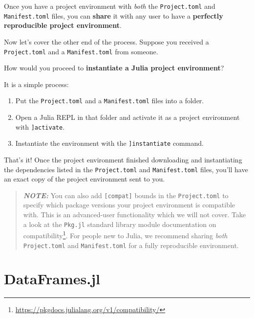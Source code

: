 \documentclass[
  notoc %
]{tufte-book}
\DeclareRobustCommand{\href}[2]{#2\footnote{\url{#1}}}
\providecommand{\tightlist}{%
  \setlength{\itemsep}{0pt}\setlength{\parskip}{0pt}
}
\newcommand{\passthrough}[1]{#1}
\begin{document}
Once you have a project environment with \emph{both} the
\passthrough{\lstinline!Project.toml!} and
\passthrough{\lstinline!Manifest.toml!} files, you can \textbf{share} it
with any user to have a \textbf{perfectly reproducible project
environment}.

Now let's cover the other end of the process. Suppose you received a
\passthrough{\lstinline!Project.toml!} and a
\passthrough{\lstinline!Manifest.toml!} from someone.

How would you proceed to \textbf{instantiate a Julia project
environment}?

It is a simple process:

\begin{enumerate}
\def\labelenumi{\arabic{enumi}.}
\tightlist
\item
  Put the \passthrough{\lstinline!Project.toml!} and a
  \passthrough{\lstinline!Manifest.toml!} files into a folder.
\item
  Open a Julia REPL in that folder and activate it as a project
  environment with \passthrough{\lstinline!]activate!}.
\item
  Instantiate the environment with the
  \passthrough{\lstinline!]instantiate!} command.
\end{enumerate}

That's it! Once the project environment finished downloading and
instantiating the dependencies listed in the
\passthrough{\lstinline!Project.toml!} and
\passthrough{\lstinline!Manifest.toml!} files, you'll have an exact copy
of the project environment sent to you.

\begin{quote}
\textbf{\emph{NOTE:}} You can also add
\passthrough{\lstinline![compat]!} bounds in the
\passthrough{\lstinline!Project.toml!} to specify which package versions
your project environment is compatible with. This is an advanced-user
functionality which we will not cover. Take a look at the
\href{https://pkgdocs.julialang.org/v1/compatibility/}{\passthrough{\lstinline!Pkg.jl!}
standard library module documentation on compatibility}. For people new
to Julia, we recommend sharing \emph{both}
\passthrough{\lstinline!Project.toml!} and
\passthrough{\lstinline!Manifest.toml!} for a fully reproducible
environment.
\end{quote}

\hypertarget{sec:dataframes}{%
\chapter{DataFrames.jl}\label{sec:dataframes}}
\end{document}
